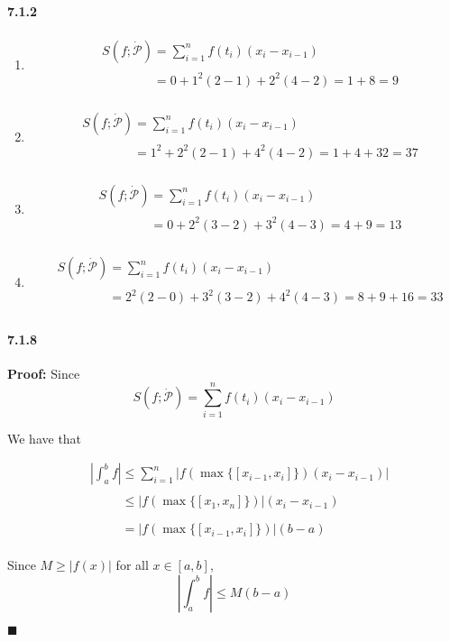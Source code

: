 \documentclass[11pt]{article}
\newcommand{\qed}{
	\begin{flushright}
		$\blacksquare$
	\end{flushright}}
\begin{document}
	\paragraph{7.1.2}
		\begin{enumerate}
			\item 
				\begin{align}
					&S(f;\mathcal{\dot{P}}) = \sum^n_{i = 1}f(t_i)(x_i - x_{i - 1})\nonumber\\
					&\phantom{S(f;\mathcal{\dot{P}})} = 0 + 1^2(2 - 1)+2^2(4 -2) = 1 + 8 = 9\nonumber
				\end{align}
					
			\item
				\begin{align}
					&S(f;\mathcal{\dot{P}}) = \sum^n_{i = 1}f(t_i)(x_i - x_{i - 1})\nonumber\\
					&\phantom{S(f;\mathcal{\dot{P}})} = 1^2 + 2^2(2 - 1)+4^2(4 -2) = 1 + 4 + 32 = 37\nonumber
				\end{align}
				
			\item
				\begin{align}
					&S(f;\mathcal{\dot{P}}) = \sum^n_{i = 1}f(t_i)(x_i - x_{i - 1})\nonumber\\
					&\phantom{S(f;\mathcal{\dot{P}})} = 0 + 2^2(3 - 2)+3^2(4 -3) = 4 + 9 = 13\nonumber
				\end{align}
			\item
				\begin{align}
					&S(f;\mathcal{\dot{P}}) = \sum^n_{i = 1}f(t_i)(x_i - x_{i - 1})\nonumber\\
					&\phantom{S(f;\mathcal{\dot{P}})} = 2^2(2 - 0) + 3^2(3 - 2)+4^2(4 -3) = 8 + 9 + 16 = 33\nonumber
				\end{align}
		\end{enumerate}
	\paragraph{7.1.8}\textbf{Proof:}
		Since 
		\[S(f;\mathcal{\dot{P}}) = \sum^n_{i = 1}f(t_i)(x_i - x_{i - 1})\]
		
		We have that 
		
		\begin{align}
			&|\int_{a}^{b}f| \leq \sum^n_{i = 1}|f(\max\{[x_{i - 1}, x_i]\})(x_i - x_{i - 1})|\nonumber\\
			&\phantom{|\int_{a}^{b}f|} \leq |f(\max\{[x_1, x_n]\})|(x_i - x_{i - 1})\nonumber\\
			&\phantom{|\int_{a}^{b}f|} = |f(\max\{[x_{i - 1}, x_i]\})|(b - a)\nonumber
		\end{align}
		
		Since $M \geq |f(x)|$ for all $x \in [a, b]$, 
		\[|\int_{a}^{b}f| \leq M(b -a)\]
		\qed
\end{document}
